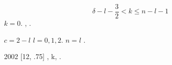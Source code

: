 \documentclass[a4paper]{article}
\begin{document}
\begin{equation*}
\delta -l-\frac 3 2<k{\leq}n-l-1
\end{equation*}
{\CYRV} {\cyrk}{\cyra}{\cyrch}{\cyre}{\cyrs}{\cyrt}{\cyrv}{\cyre}
{\cyrv}{\cyro}{\cyrz}{\cyrm}{\cyro}{\cyrzh}{\cyrn}{\cyro}{\cyrg}{\cyro} {\cyrv}{\cyrery}{\cyrb}{\cyro}{\cyrr}{\cyra}
{\CYRM}{\cyra}{\cyrr}{\cyrt}{\cyri}{\cyrn} {\cyrp}{\cyrr}{\cyri}{\cyrv}{\cyro}{\cyrd}{\cyri}{\cyrt}  $k=0$. {\CYRV}
{\cyrerev}{\cyrt}{\cyro}{\cyrm} {\cyrs}{\cyrl}{\cyru}{\cyrch}{\cyra}{\cyre}
{\cyrk}{\cyro}{\cyrl}{\cyri}{\cyrch}{\cyre}{\cyrs}{\cyrt}{\cyrv}{\cyro} {\cyru}{\cyrz}{\cyrl}{\cyro}{\cyrv} {\cyrv}
{\cyrv}{\cyro}{\cyrl}{\cyrn}{\cyro}{\cyrv}{\cyro}{\cyrishrt} {\cyrf}{\cyru}{\cyrn}{\cyrk}{\cyrc}{\cyri}{\cyri}
{\cyrt}{\cyra}{\cyrk}{\cyro}{\cyre} {\cyrzh}{\cyre}, {\cyrk}{\cyra}{\cyrk} {\cyru}
{\cyrs}{\cyro}{\cyro}{\cyrt}{\cyrv}{\cyre}{\cyrt}{\cyrs}{\cyrt}{\cyrv}{\cyru}{\cyryu}{\cyrshch}{\cyre}{\cyrishrt}
{\cyrv}{\cyro}{\cyrl}{\cyrn}{\cyro}{\cyrv}{\cyro}{\cyrishrt} {\cyrf}{\cyru}{\cyrn}{\cyrk}{\cyrc}{\cyri}{\cyri}
{\cyra}{\cyrt}{\cyro}{\cyrm}{\cyra} {\cyrv}{\cyro}{\cyrd}{\cyro}{\cyrr}{\cyro}{\cyrd}{\cyra}.

{\CYRV} {\cyrs}{\cyro}{\cyrb}{\cyrs}{\cyrt}{\cyrv}{\cyre}{\cyrn}{\cyrn}{\cyro}{\cyrishrt}
{\cyrr}{\cyra}{\cyrb}{\cyro}{\cyrt}{\cyre} {\CYRM}{\cyra}{\cyrr}{\cyrt}{\cyri}{\cyrn}
{\cyri}{\cyrs}{\cyrp}{\cyro}{\cyrl}{\cyrsftsn}{\cyrz}{\cyru}{\cyre}{\cyrt}  $c=2-l$ {\cyrd}{\cyrl}{\cyrya}  $l=0,1,2$.
{\CYRV} {\cyrerev}{\cyrt}{\cyro}{\cyrm} {\cyrs}{\cyrl}{\cyru}{\cyrch}{\cyra}{\cyre}
{\cyrr}{\cyra}{\cyrd}{\cyri}{\cyra}{\cyrl}{\cyrsftsn}{\cyrn}{\cyra}{\cyrya}
{\cyrv}{\cyro}{\cyrl}{\cyrn}{\cyro}{\cyrv}{\cyra}{\cyrya} {\cyrf}{\cyru}{\cyrn}{\cyrk}{\cyrc}{\cyri}{\cyrya}
{\cyrp}{\cyrr}{\cyri}  $n=l$ {\cyrn}{\cyre} {\cyri}{\cyrm}{\cyre}{\cyre}{\cyrt} {\cyru}{\cyrz}{\cyrl}{\cyro}{\cyrv}.

{\CYRV} {\cyrs}{\cyrt}{\cyra}{\cyrt}{\cyrsftsn}{\cyre} 2002 {\cyrg}{\cyro}{\cyrd}{\cyra} [12, {\cyrs}{\cyrt}{\cyrr}.75]
{\CYRA}{\cyrl}{\cyrch}{\cyre}{\cyre}{\cyrv}, {\cyrt}{\cyra}{\cyrk}{\cyrzh}{\cyre}
{\cyro}{\cyrb}{\cyrs}{\cyru}{\cyrzh}{\cyrd}{\cyra}{\cyrya} {\cyrp}{\cyrr}{\cyro}{\cyrb}{\cyrl}{\cyre}{\cyrm}{\cyru}
{\cyrv}{\cyrery}{\cyrb}{\cyro}{\cyrr}{\cyra} \foreignlanguage{english}{k},
{\cyri}{\cyrs}{\cyrp}{\cyro}{\cyrl}{\cyrsftsn}{\cyrz}{\cyru}{\cyre}{\cyrt} {\cyrd}{\cyrl}{\cyrya}
{\cyrn}{\cyre}{\cyrg}{\cyro} {\cyrs}{\cyrl}{\cyre}{\cyrd}{\cyru}{\cyryu}{\cyrshch}{\cyre}{\cyre}
{\cyrv}{\cyrery}{\cyrr}{\cyra}{\cyrzh}{\cyre}{\cyrn}{\cyri}{\cyre}.
\end{document}
